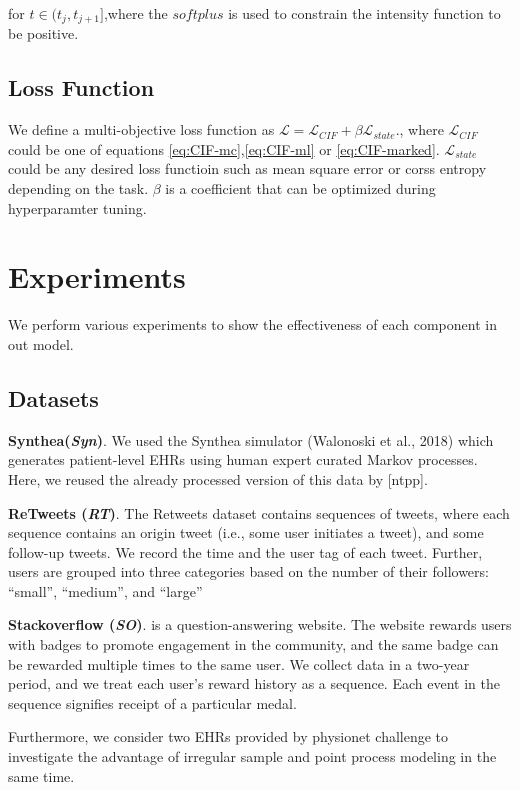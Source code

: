 \documentclass[journal,twoside,web]{ieeecolor}
\begin{document}
for $t \in (t_j, t_{j+1}]$,where the $softplus$ is used to constrain the intensity function to be positive.


\subsection{Loss Function}

We define a multi-objective loss function as $ \mathcal{L}   =   \mathcal{L}_{CIF}   +   \beta \mathcal{L}_{state}$., where $\mathcal{L}_{CIF}$ could be one of equations \ref*{eq:CIF-mc},\ref*{eq:CIF-ml} or \ref*{eq:CIF-marked}. $\mathcal{L}_{state}$ could be any desired loss functioin such as mean square error or corss entropy depending on the task. $\beta$ is a coefficient that can be optimized during hyperparamter tuning.





\section{Experiments}
\label{sec:Experiments}

We perform various experiments to show the effectiveness of each component in out model.
\subsection*{Datasets}

\textbf{Synthea(\emph{Syn})}.
We used the Synthea simulator (Walonoski et al., 2018) which generates patient-level EHRs using human expert curated Markov processes. Here, we reused the already processed version of this data by [ntpp].

\textbf{ReTweets (\emph{RT})}.
The Retweets dataset contains sequences of tweets, where each sequence contains an origin tweet (i.e., some user initiates a tweet), and some follow-up tweets. We record the time and the user tag of each tweet. Further, users are grouped into three categories based on the number of their followers: “small”, “medium”, and “large”

\textbf{Stackoverflow (\emph{SO})}.
is a question-answering website. The website rewards users with badges to promote engagement in the community, and the same badge can be rewarded multiple times to the same user. We collect data in a two-year period, and we treat each user’s reward history as a sequence. Each event in the sequence signifies receipt of a particular medal.

Furthermore, we consider two EHRs provided by physionet challenge to investigate the advantage of irregular sample and point process modeling in the same time.
\end{document}
